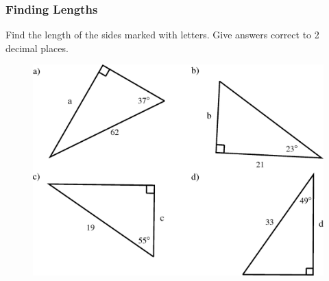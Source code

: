     \addtocounter{footnote}{-0}
    \par \label{m39408*secfhsst!!!underscore!!!id1260}
            \subsubsection{ Finding Lengths }
            \nopagebreak
            \label{m39408*id81582}Find the length of the sides marked with letters. Give answers correct to 2 decimal places.
      
    \setcounter{subfigure}{0}


	\begin{figure}[H] %
    \begin{center}
    \label{m39408*id81592!!!underscore!!!media}\label{m39408*id81592!!!underscore!!!printimage}\includegraphics{col11306.imgs/m39408_MG10C15_010.png} %
        
      \vspace{2pt}
    \vspace{.1in}
    
    \end{center}

 \end{figure}   

    \addtocounter{footnote}{-0}
    
      
    \setcounter{subfigure}{0}


